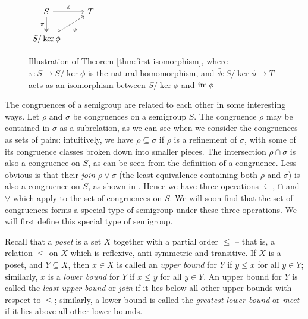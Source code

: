 \begin{figure}[ht]
  \centering
  $
  \begin{tikzcd}
    S \ar[d, two heads, "\pi"'] \ar[r, "\phi"] & T \\
    S / \ker{\phi} \ar[ur, dashed, hook, "\bar\phi"']
  \end{tikzcd}
  $
  \caption[Illustration of Theorem \ref{thm:first-isomorphism}]
  {Illustration of Theorem \ref{thm:first-isomorphism}, where
    $\pi : S \to S/\ker\phi$ is the natural homomorphism, and
    $\bar\phi: S/\ker\phi \to T$ acts as an isomorphism between $S/\ker\phi$ and
    $\operatorname{im}\phi$}
  \label{fig:first-isomorphism-theorem}
\end{figure}

The congruences of a semigroup are related to each other in some interesting
ways.  Let $\rho$ and $\sigma$ be congruences on a semigroup $S$.  The
congruence $\rho$ may be contained in $\sigma$ as a subrelation, as we can see
when we consider the congruences as sets of pairs: intuitively, we have
$\rho \subseteq \sigma$ if $\rho$ is a refinement of $\sigma$, with some of its
congruence classes broken down into smaller pieces.  The intersection
$\rho \cap \sigma$ is also a congruence on $S$, as can be seen from the
definition of a congruence.  Less obvious is that their \textit{join}
$\rho \vee \sigma$ (the least equivalence containing both $\rho$ and $\sigma$)
is also a congruence on $S$, as shown in \cite[\S1.5]{howie}.  Hence we have
three operations $\subseteq$, $\cap$ and $\vee$ which apply to the set of
congruences on $S$.  We will soon find that the set of congruences
forms a special type of semigroup under these three operations.  We will first
define this special type of semigroup.

Recall that a \textit{poset} is a set $X$ together with a partial order $\leq$
-- that is, a relation $\leq$ on $X$ which is reflexive, anti-symmetric and
transitive.  If $X$ is a poset, and $Y \subseteq X$, then $x \in X$ is called an
\textit{upper bound} for $Y$ if $y \leq x$ for all $y \in Y$; similarly, $x$ is
a \textit{lower bound} for $Y$ if $x \leq y$ for all $y \in Y$.  An upper bound
for $Y$ is called the \textit{least upper bound} or \textit{join} if it lies
below all other upper bounds with respect to $\leq$; similarly, a lower bound is
called the \textit{greatest lower bound} or \textit{meet} if it lies above all
other lower bounds.    
   

